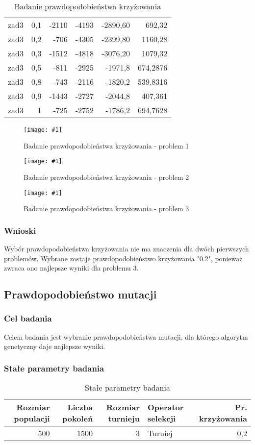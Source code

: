 \documentclass[12pt,a4paper]{article}
\newcommand{\image}[2] {
    \begin{figure}[H]
        \begin{center}
            \texttt{[image: \#1]}
        \end{center}
        \caption{#2}
        \label{#1}
    \end{figure}
}
\begin{document}
\begin{table}[htbp]
\begin{tabular}{crrrrr}
    zad3  & 0,1   & -2110 & -4193 & -2890,60 & 692,32 \\
    zad3  & 0,2   & -706  & -4305 & -2399,80 & 1160,28 \\
    zad3  & 0,3   & -1512 & -4818 & -3076,20 & 1079,32 \\
    zad3  & 0,5   & -811  & -2925 & -1971,8 & 674,2876 \\
    zad3  & 0,8   & -743  & -2116 & -1820,2 & 539,8316 \\
    zad3  & 0,9   & -1443 & -2727 & -2044,8 & 407,361 \\
    zad3  & 1     & -725  & -2752 & -1786,2 & 694,7628 \\
    \end{tabular}%
  \label{tab:addlabel}%
  \caption{Badanie prawdopodobieństwa krzyżowania}
\end{table}%

\image{images/Badanie p. krzyżowania_1}{Badanie prawdopodobieństwa krzyżowania - problem 1}
\image{images/Badanie p. krzyżowania_2}{Badanie prawdopodobieństwa krzyżowania - problem 2}
\image{images/Badanie p. krzyżowania_3}{Badanie prawdopodobieństwa krzyżowania - problem 3}
\subsubsection{Wnioski}
Wybór prawdopodobieństwa krzyżowania nie ma znaczenia dla dwóch pierwszych problemów.
Wybrane zostaje prawdopodobieństwo krzyżowania "0.2", ponieważ zwraca ono najlepsze wyniki dla problemu 3.

\subsection{Prawdopodobieństwo mutacji}
\subsubsection{Cel badania}
Celem badania jest wybranie prawdopodobieństwa mutacji, dla którego algorytm genetyczny daje najlepsze wyniki.

\subsubsection{Stałe parametry badania}
\begin{table}[htbp]
  \centering
    \begin{tabular}{rrrlr}
    \multicolumn{1}{p{4.215em}}{\textbf{Rozmiar populacji}} & \multicolumn{1}{p{4.215em}}{\textbf{Liczba pokoleń}} & \multicolumn{1}{p{4.215em}}{\textbf{Rozmiar turnieju}} & \multicolumn{1}{p{4.215em}}{\textbf{Operator selekcji}} & \multicolumn{1}{p{5.645em}}{\textbf{Pr. krzyżowania}} \\
    \midrule
    500   & 1500  & 3     & Turniej & 0,2 \\
    \end{tabular}%
  \caption{Stałe parametry badania}
  \label{tab:addlabel}%
\end{table}%
\end{document}
